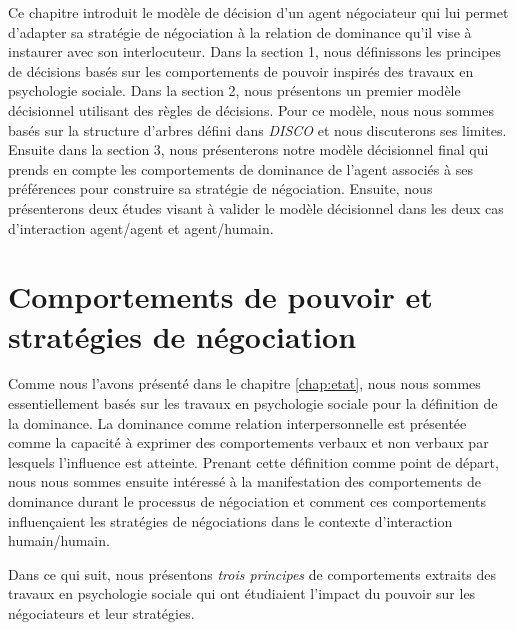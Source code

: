 	\label{chap:dec}
	
	Ce chapitre introduit le modèle de décision d'un agent négociateur qui lui permet d'adapter sa stratégie de négociation à la relation de dominance qu'il vise à instaurer avec son interlocuteur. Dans la section 1, nous définissons les principes de décisions basés sur les comportements de pouvoir inspirés des travaux en psychologie sociale. Dans la section 2, nous présentons un premier modèle décisionnel utilisant des règles de décisions.  Pour ce modèle, nous nous sommes basés sur la structure d'arbres défini dans \emph{DISCO} \cite{rich09} et nous discuterons ses limites. Ensuite dans la section 3, nous présenterons notre modèle décisionnel final qui prends en compte les comportements de dominance de l'agent associés à ses préférences pour construire sa stratégie de négociation. Ensuite, nous présenterons deux études visant à valider le modèle décisionnel dans les deux cas d'interaction agent/agent et agent/humain.
	
	\section{Comportements de pouvoir et stratégies de négociation}
	\label{chap:domer}
	Comme nous l'avons présenté dans le chapitre \ref{chap:etat}, nous nous sommes essentiellement basés sur les travaux en psychologie sociale pour la définition de la dominance. 
	La dominance comme relation interpersonnelle est présentée comme la capacité à exprimer des comportements verbaux et non verbaux par lesquels  l'influence est atteinte. Prenant cette définition comme point de départ, nous nous sommes ensuite intéressé à la manifestation des comportements de dominance durant le processus de négociation et comment ces comportements influençaient les stratégies de négociations dans le contexte d'interaction humain/humain. 
	
	Dans ce qui suit, nous présentons \emph{trois principes} de comportements extraits des travaux en psychologie sociale qui ont étudiaient l'impact du pouvoir sur les négociateurs et leur stratégies.
	
